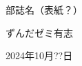 \begin{titlepage}
  \centering
  \vspace*{5cm}
  \Huge{部誌名（表紙？）}
  
  \vspace*{1cm}
  \large{ずんだゼミ有志}

  \vspace*{0.5cm}
  \large{2024年10月??日}

  \centering
\end{titlepage}